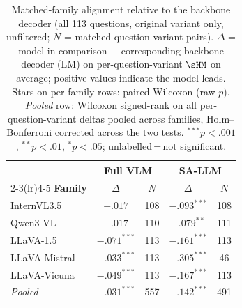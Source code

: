 \begin{table}[ht]
\centering\small\setlength{\tabcolsep}{5pt}
\begin{tabular}{l cc cc}
\toprule
& \multicolumn{2}{c}{\textbf{Full VLM}} & \multicolumn{2}{c}{\textbf{SA-LLM}} \\
\cmidrule(lr){2-3}\cmidrule(lr){4-5}
\textbf{Family} & $\Delta$ & $N$ & $\Delta$ & $N$ \\
\midrule
InternVL3.5 & $+.017$ & 108 & $-.093^{***}$ & 108 \\
Qwen3-VL & $-.017$ & 110 & $-.079^{**}$ & 111 \\
LLaVA-1.5 & $-.071^{***}$ & 113 & $-.161^{***}$ & 113 \\
LLaVA-Mistral & $-.033^{***}$ & 113 & $-.305^{***}$ & 46 \\
LLaVA-Vicuna & $-.049^{***}$ & 113 & $-.167^{***}$ & 113 \\
\midrule
\textit{Pooled} & $-.031^{***}$ & 557 & $-.142^{***}$ & 491 \\
\bottomrule
\end{tabular}
\caption{Matched-family alignment relative to the backbone decoder (all 113 questions, original variant only, unfiltered; $N$ = matched question-variant pairs).
$\Delta$ = model in comparison $-$ corresponding backbone decoder (LM) on per-question-variant $\sHM$ on average; positive values indicate the model leads.
Stars on per-family rows: paired Wilcoxon (raw $p$). \textit{Pooled} row: Wilcoxon signed-rank on all per-question-variant deltas pooled across families, Holm--Bonferroni corrected across the two tests. ${}^{***}p{<}.001$, ${}^{**}p{<}.01$, ${}^{*}p{<}.05$; unlabelled\,=\,not significant.}
\label{tab:matched_family_alignment_tests_orig_raw}
\end{table}
